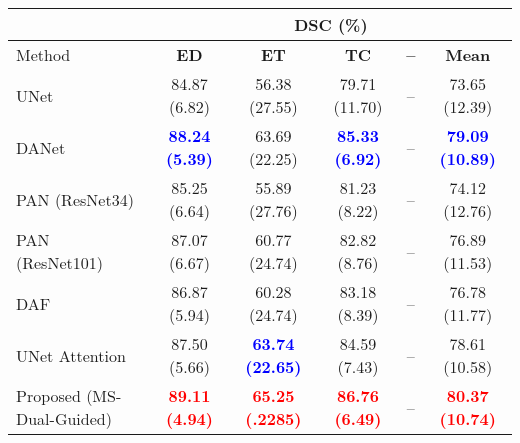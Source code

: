 \documentclass[journal]{IEEEtran}
\begin{document}
\begin{table*}[t!]
\centering
\scriptsize
\begin{tabular}{lcccc|c}\\
\toprule
 & \multicolumn{5}{c}{\textbf{DSC} (\%)}\\
 \midrule
Method & \textbf{ED} & \textbf{ET} & \textbf{TC} & \textbf{--} & \textbf{Mean}  \\
 \midrule
UNet \cite{ronneberger2015u}  & 84.87 (6.82)  & 56.38 (27.55) & 79.71 (11.70) & -- &  73.65 (12.39) \\
DANet \cite{fu2018dual}  & \textcolor{blue}{\textbf{88.24  (5.39)}} & 63.69 (22.25)& \textcolor{blue}{\textbf{85.33 (6.92)}} & --&  \textcolor{blue}{\textbf{79.09 (10.89)}}   \\
PAN (ResNet34) \cite{li2018pyramid}   & 85.25 (6.64)  & 55.89 (27.76) & 81.23  (8.22) & -- & 74.12 (12.76) \\
PAN (ResNet101)\cite{li2018pyramid}   & 87.07 (6.67)  & 60.77 (24.74) & 82.82 (8.76) & -- & 76.89 (11.53) \\
DAF \cite{wang18d}  &  86.87 (5.94) & 60.28 (24.74)& 83.18 (8.39) &  -- &  76.78 (11.77)   \\
UNet Attention \cite{schlemper2019attention}  &   87.50 (5.66) & \textcolor{blue}{\textbf{63.74 (22.65)}}&  84.59 (7.43) & -- &  78.61 (10.58)   \\
Proposed (MS-Dual-Guided)  & \textcolor{red}{\textbf{89.11 (4.94)}}  & \textcolor{red}{\textbf{65.25 (.2285)}}& \textcolor{red}{\textbf{86.76 (6.49)}}  & -- &  \textcolor{red}{\textbf{80.37 (10.74)}} \\


\end{tabular}
\end{table*}
\end{document}
